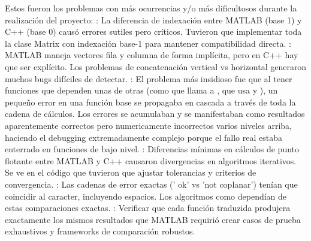 \markdownRendererDocumentBegin
\markdownRendererSectionBegin
{}\markdownRendererInterblockSeparator
{}Estos fueron los problemas con más ocurrencias y/o más dificultosos durante la realización del proyecto:\markdownRendererInterblockSeparator
{}:\markdownRendererInterblockSeparator
{}La diferencia de indexación entre MATLAB (base 1) y C++ (base 0) causó errores sutiles pero críticos. Tuvieron que implementar toda la clase Matrix con indexación base-1 para mantener compatibilidad directa.\markdownRendererInterblockSeparator
{}:\markdownRendererInterblockSeparator
{}MATLAB maneja vectores fila y columna de forma implícita, pero en C++ hay que ser explícito. Los problemas de concatenación vertical vs horizontal generaron muchos bugs difíciles de detectar.\markdownRendererInterblockSeparator
{}:\markdownRendererInterblockSeparator
{}El problema más insidioso fue que al tener funciones que dependen unas de otras (como  que llama a , que usa  y ), un pequeño error en una función base se propagaba en cascada a través de toda la cadena de cálculos. Los errores se acumulaban y se manifestaban como resultados aparentemente correctos pero numericamente incorrectos varios niveles arriba, haciendo el debugging extremadamente complejo porque el fallo real estaba enterrado en funciones de bajo nivel.\markdownRendererInterblockSeparator
{}:\markdownRendererInterblockSeparator
{}Diferencias mínimas en cálculos de punto flotante entre MATLAB y C++ causaron divergencias en algoritmos iterativos. Se ve en el código que tuvieron que ajustar tolerancias y criterios de convergencia.\markdownRendererInterblockSeparator
{}:\markdownRendererInterblockSeparator
{}Las cadenas de error exactas (' ok' vs 'not coplanar') tenían que coincidir al caracter, incluyendo espacios. Los algoritmos como  dependían de estas comparaciones exactas.\markdownRendererInterblockSeparator
{}:\markdownRendererInterblockSeparator
{}Verificar que cada función traduzida produjera exactamente los mismos resultados que MATLAB requirió crear casos de prueba exhaustivos y frameworks de comparación robustos.
\markdownRendererSectionEnd \markdownRendererDocumentEnd